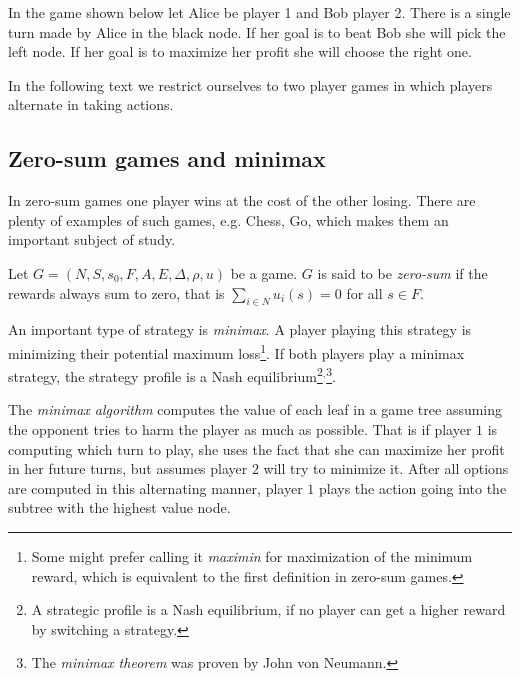 \begin{example}
    In the game shown below let Alice be player 1 and Bob player 2.
    There is a single turn made by Alice in the black node.
If her goal is to beat Bob she will pick the left node.
If her goal is to maximize her profit she will choose the right one.

\begin{center}
\end{center}
\end{example}

In the following text
we restrict ourselves to two player games in which players alternate in
taking actions.

\subsection{Zero-sum games and minimax}

In zero-sum games one player wins at the cost of the other losing.
There are plenty of examples of such games, e.g. Chess, Go, which makes
them an important subject of study.

\begin{definition}
    Let $G = (N, S, s_0, F, A, E, \Delta, \rho, u)$ be a game.
    $G$ is said to be {\em zero-sum} if the rewards always sum to zero,
    that is $\sum_{i \in N} u_i(s) = 0$ for all $s \in F$.
\end{definition}

An important type of strategy is {\em minimax}. A player playing this
strategy is minimizing their potential maximum loss\footnote{Some might
prefer calling it {\em maximin} for maximization of the minimum reward,
which is equivalent to the first definition in zero-sum games.}. If both players play a
minimax strategy, the strategy profile is a Nash
equilibrium\footnote{
A strategic profile is a Nash equilibrium, if no player can get a higher
reward by switching a strategy.
    }$^,$\footnote{The {\em minimax theorem} was proven by John
von Neumann.}.

The {\em minimax algorithm} computes the value of each leaf in a game
tree assuming the opponent tries to harm the player as much as
possible. That is if player $1$ is computing which turn to play,
she uses the fact that she can maximize her profit in her future turns,
but assumes player $2$ will try to minimize it.
After all options are computed in this alternating manner,
player $1$ plays the action going into the subtree with the highest value node.

